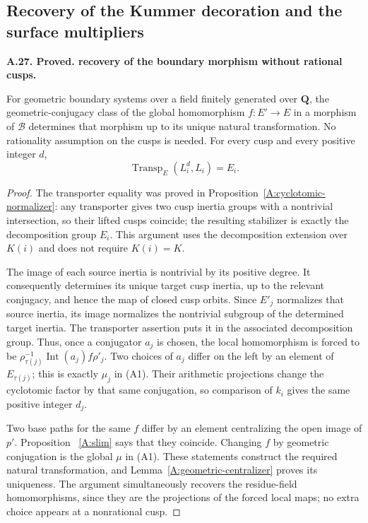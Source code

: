 \documentclass[11pt,oneside]{article}
\makeatletter
\newcounter{statementanchor}
\newenvironment{statement}[3]{%
 \refstepcounter{statementanchor}\def\@currentlabel{#1}%
 \par\addvspace{9pt}\noindent
 \textbf{#1. #2. #3.}\par\nobreak\noindent\ignorespaces
}{\par\addvspace{5pt}}
\makeatother
\begin{document}
\subsection{Recovery of the Kummer decoration and the surface multipliers}

\begin{statement}{A.27}{Proved}{recovery of the boundary morphism without rational cusps}
\label{st:A.27}
\label{A:boundary-recovery}
For geometric boundary systems over a field finitely
generated over $\mathbf Q$, the geometric-conjugacy
class of the global homomorphism $f:E'\to E$ in a
morphism of $\mathcal B$ determines that morphism up
to its unique natural transformation.  No rationality
assumption on the cusps is needed.  For every cusp
and every positive integer $d$,
\[
                   \operatorname{Transp}_E(L_i^d,L_i)=E_i.
\]
\end{statement}
\begin{proof}
The transporter equality was proved in
Proposition~\ref{A:cyclotomic-normalizer}: any
transporter gives two cusp inertia groups with a
nontrivial intersection, so their lifted cusps coincide;
the resulting stabilizer is exactly the decomposition
group $E_i$.  This argument uses the decomposition
extension over $K(i)$ and does not require $K(i)=K$.

The image of each source inertia is nontrivial by its
positive degree.  It consequently determines its
unique target cusp inertia, up to the relevant
conjugacy, and hence the map of closed cusp orbits.
Since $E'_j$ normalizes that source inertia, its image
normalizes the nontrivial subgroup of the determined
target inertia.  The transporter assertion puts it
in the associated decomposition group.  Thus, once a
conjugator $a_j$ is chosen, the local homomorphism is
forced to be $\rho_{\tau(j)}^{-1}
\operatorname{Int}(a_j)f\rho'_j$.  Two choices of
$a_j$ differ on the left by an element of
$E_{\tau(j)}$; this is exactly $\mu_j$ in (A1).
Their arithmetic projections change the cyclotomic
factor by that same conjugation, so comparison of
$k_i$ gives the same positive integer $d_j$.

Two base paths for the same $f$ differ by an element
centralizing the open image of $p'$.  Proposition~
\ref{A:slim} says that they coincide.  Changing $f$
by geometric conjugation is the global $\mu$ in
(A1).  These statements construct the required natural
transformation, and Lemma~\ref{A:geometric-centralizer}
proves its uniqueness.  The argument simultaneously
recovers the residue-field homomorphisms, since they
are the projections of the forced local maps; no
extra choice appears at a nonrational cusp.
\end{proof}
\end{document}
